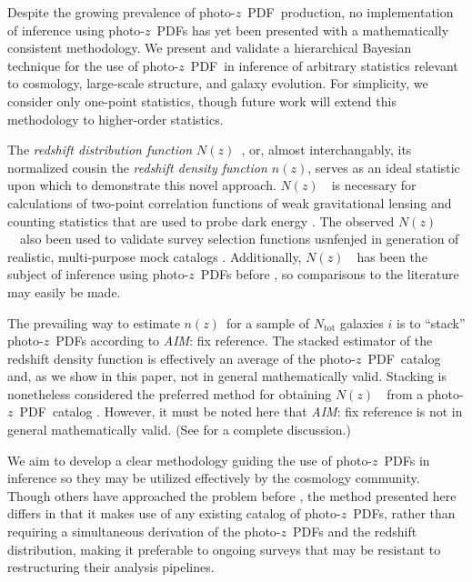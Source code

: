 \documentclass[iop]{emulateapj}
\newcommand{\todo}[3]{{\color{#2}\emph{#1}: #3}}
\newcommand{\aim}[1]{\todo{AIM}{red}{#1}}
\newcommand{\nz}{$n(z)$}
\newcommand{\pz}{photo-$z$~}
\newcommand{\pzpdf}{\pz PDF}
\newcommand{\Nz}{$N(z)$~}
\newcommand{\ntot}{\ensuremath{N_{\mathrm{tot}}}}
\begin{document}
Despite the growing prevalence of \pzpdf\ production, no implementation of inference using \pzpdf s has yet been presented with a mathematically consistent methodology.  
We present and validate a hierarchical Bayesian technique for the use of \pzpdf\ in inference of arbitrary statistics relevant to cosmology, large-scale structure, and galaxy evolution.  
For simplicity, we consider only one-point statistics, though future work will extend this methodology to higher-order statistics.

The \textit{redshift distribution function \Nz}, or, almost interchangably, its normalized cousin the \textit{redshift density function \nz}, serves as an ideal statistic upon which to demonstrate this novel approach.  
\Nz\ is necessary for calculations of two-point correlation functions of weak gravitational lensing and counting statistics that are used to probe dark energy \citep{masters_mapping_2015}.  
The observed \Nz\ also been used to validate survey selection functions usnfenjed in generation of realistic, multi-purpose mock catalogs \citep{norberg_2df_2002}.  
Additionally, \Nz\ has been the subject of inference using \pzpdf s before \citep{sheldon_photometric_2012, hildebrandt_cfhtlens:_2012, kelly_weighing_2014, benjamin_cfhtlens_2013, bonnett_using_2015, viironen_high_2015, asorey_galaxy_2016, leistedt_hierarchical_2016}, so comparisons to the literature may easily be made. 

The prevailing way to estimate \nz\ for a sample of $\ntot$ galaxies $i$ is to ``stack'' \pzpdf s according to \aim{fix reference}.
The stacked estimator of the redshift density function is effectively an average of the \pzpdf\ catalog and, as we show in this paper, not in general mathematically valid.
Stacking is nonetheless considered the preferred method for obtaining \Nz\ from a \pzpdf\ catalog \citep{sheldon_photometric_2012, kelly_weighing_2014, benjamin_cfhtlens_2013, bonnett_using_2015, viironen_high_2015, asorey_galaxy_2016}.  
However, it must be noted here that \aim{fix reference}
is not in general mathematically valid.  
(See \citet{hogg_data_2012} for a complete discussion.)  


We aim to develop a clear methodology guiding the use of \pzpdf s in inference so they may be utilized effectively by the cosmology community.
Though others have approached the problem before \citep{leistedt_hierarchical_2016}, the method presented here differs in that it makes use of any existing catalog of \pzpdf s, rather than requiring a simultaneous derivation of the \pzpdf s and the redshift distribution, making it preferable to ongoing surveys that may be resistant to restructuring their analysis pipelines.
\end{document}
